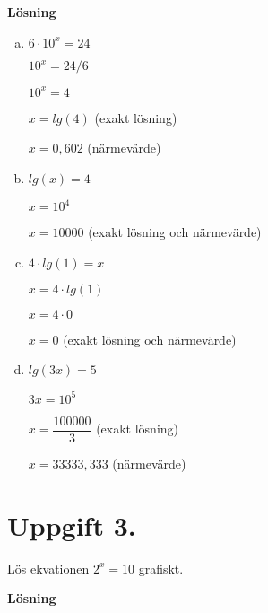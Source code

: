 \documentclass{article}
\begin{document}
\textbf{Lösning}

\begin{enumerate}[(a)]
\item $ 6 \cdot 10^x = 24 $

$ 10^x = 24 / 6 $

$ 10^x = 4 $

$ x = lg(4) $	\tab(exakt lösning)

$ x = 0,602 $	\tab(närmevärde)

\item $ lg(x) = 4 $

$ x = 10^4 $

$ x = 10000 $	\tab(exakt lösning och närmevärde)

\item $ 4 \cdot lg(1) = x $

$ x = 4 \cdot lg(1) $

$ x = 4 \cdot 0 $

$ x = 0 $	\tab(exakt lösning och närmevärde)

\item $ lg(3x) = 5 $

$ 3x = 10^5 $

$ x = \dfrac{100000}{3} $	\tab(exakt lösning)

$ x = 33333,333$	\tab(närmevärde)

\end{enumerate}
\section*{Uppgift 3.}
Lös ekvationen $ 2^x = 10 $ grafiskt.

\textbf{Lösning}

\end{document}
